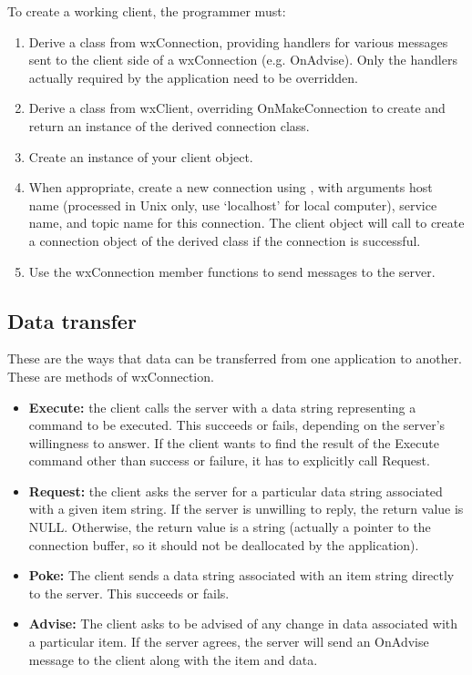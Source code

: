 To create a working client, the programmer must:

\begin{enumerate}\itemsep=0pt
\item Derive a class from wxConnection, providing handlers for various
messages sent to the client side of a wxConnection (e.g.
OnAdvise). Only the handlers actually required by the application
need to be overridden.
\item Derive a class from wxClient, overriding OnMakeConnection to
create and return an instance of the derived connection class.
\item Create an instance of your client object.
\item When appropriate, create a new connection using
,
with arguments host name (processed in Unix only, use `localhost'
for local computer), service name, and topic name for this
connection. The client object will call
 to create
a connection object of the derived class if the connection is
successful.
\item Use the wxConnection member functions to send messages to the server.
\end{enumerate}

\subsection{Data transfer}\label{datatransfer}

These are the ways that data can be transferred from one
application to another. These are methods of wxConnection.

\begin{itemize}\itemsep=0pt
\item {\bf Execute:} the client calls the server with a data string representing
a command to be executed. This succeeds or fails, depending on the
server's willingness to answer. If the client wants to find the result
of the Execute command other than success or failure, it has to explicitly
call Request.
\item {\bf Request:} the client asks the server for a particular data string
associated with a given item string. If the server is unwilling to
reply, the return value is NULL. Otherwise, the return value is a string
(actually a pointer to the connection buffer, so it should not be
deallocated by the application).
\item {\bf Poke:} The client sends a data string associated with an item
string directly to the server. This succeeds or fails.
\item {\bf Advise:} The client asks to be advised of any change in data
associated with a particular item. If the server agrees, the server will
send an OnAdvise message to the client along with the item and data.
\end{itemize}

